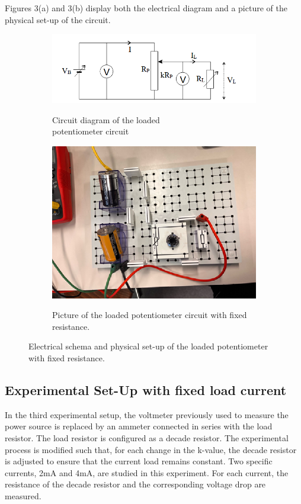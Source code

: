 \documentclass[a4paper]{article}
\begin{document}
Figures 3(a) and 3(b) display both the electrical diagram and a picture of the
physical set-up of the circuit.
\begin{figure}[!ht]
    \centering
    \begin{subfigure}{0.5\textwidth}
        \centering
        \includegraphics[width = \linewidth]{loaded pot fixed circuit.png}
        \label{fig:3a}
        \caption{Circuit diagram of the loaded \\potentiometer circuit \cite{report}}
    \end{subfigure}%
    \begin{subfigure}{0.5\textwidth}
        \centering
        \includegraphics[width = 0.8\linewidth]{loaded pot fixed pic.png}
        \label{fig:3b}
        \caption{Picture of the loaded potentiometer circuit with fixed resistance.}        
    \end{subfigure}
    \caption{Electrical schema and physical set-up of the loaded potentiometer with fixed resistance.}
\end{figure}
\newpage
\subsection{Experimental Set-Up with fixed load current}
In the third experimental setup, the voltmeter previously used to measure the power source is replaced
by an ammeter connected in series with the load resistor. 
The load resistor is configured as a decade resistor. 
The experimental process is modified such that, for each change in the k-value, the decade resistor
is adjusted to ensure that the current load remains constant.
Two specific currents, 2mA and 4mA, are studied in this experiment.
For each current, the resistance of the decade resistor and the corresponding voltage drop are measured.
\end{document}

